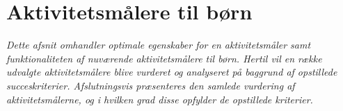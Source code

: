 \section{Aktivitetsmålere til børn} \label{tracker_intro}
\textit{Dette afsnit omhandler optimale egenskaber for en aktivitetsmåler samt funktionaliteten af nuværende aktivitetsmålere til børn. Hertil vil en række udvalgte aktivitetsmålere blive vurderet og analyseret på baggrund af opstillede succeskriterier. Afslutningsvis præsenteres den samlede vurdering af aktivitetsmålerne, og i hvilken grad disse opfylder de opstillede kriterier.}
%
